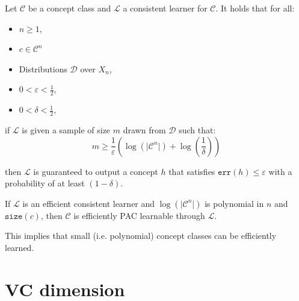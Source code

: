 \begin{theorem} 
    Let $\mathcal{C}$ be a concept class and $\mathcal{L}$ a consistent learner for $\mathcal{C}$.
    It holds that for all:
    \begin{itemize}
        \item $n \geq 1$, 
        \item $c \in \mathcal{C}^n$
        \item Distributions $\mathcal{D}$ over $X_n$,
        \item $0 < \varepsilon < \frac{1}{2}$,
        \item $0 < \delta < \frac{1}{2}$,
    \end{itemize}
    if $\mathcal{L}$ is given a sample of size $m$ drawn from $\mathcal{D}$ such that:
    \[ m \geq \frac{1}{\varepsilon} \left( \log(\vert \mathcal{C}^n \vert) + \log \left(\frac{1}{\delta}\right) \right) \]

    then $\mathcal{L}$ is guaranteed to output a concept $h$ that satisfies $\texttt{err}(h) \leq \varepsilon$ with a probability of at least $(1-\delta)$.\\[-0.5em]

    \begin{corollary}
        If $\mathcal{L}$ is an efficient consistent learner and $\log(\vert \mathcal{C}^n \vert)$ is polynomial in $n$ and $\texttt{size}(c)$,
        then $\mathcal{C}$ is efficiently PAC learnable through $\mathcal{L}$.

        \begin{remark}
            This implies that small (i.e. polynomial) concept classes can be efficiently learned.
        \end{remark}
    \end{corollary}

\end{theorem}



\section{VC dimension}

